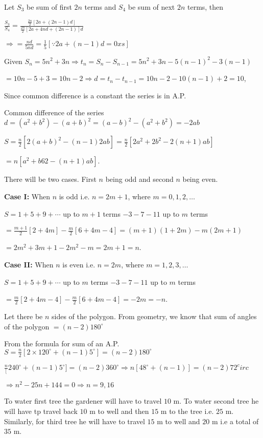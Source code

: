  Let $S_3$ be sum of first $2n$ terms and $S_4$ be sum of next $2n$ terms, then

  $\frac{S_3}{S_4} = \frac{\tfrac{2n}{2}[2a + (2n - 1)d]}{\tfrac{2n}{2}[2a + 4nd + (2n - 1)]d}$

  $\Rightarrow = \frac{nd}{5nd} = \frac{1}{5}[\because 2a + (n - 1)d = 0xs]$
\item Given $S_n = 5n^2 + 3n \Rightarrow t_n = S_n - S_{n - 1} = 5n^2 + 3n - 5(n - 1)^2 - 3(n - 1)$

  $= 10n - 5 + 3 = 10n - 2 \Rightarrow d = t_n - t_{n - 1} = 10n - 2 - 10(n - 1) + 2 = 10$,

  Since common difference is a constant the series is in A.P.
\item Common difference of the series $d = (a^2 + b^2) - (a + b)^2 = (a - b)^2 - (a^2 + b^2) = -2ab$

  $S = \frac{n}{2}[2(a + b)^2 - (n - 1)2ab] = \frac{n}{2}[2a^2 + 2b^2 - 2(n + 1)ab]$

  $= n[a^2 + b62 - (n + 1)ab]$.
\item There will be two cases. First $n$ being odd and second $n$ being even.

  {\bf Case I:} When $n$ is odd i.e. $n = 2m + 1$, where $m = 0, 1, 2, \ldots$

  $S = 1 + 5 + 9 + \cdots$ up to $m + 1$ terms $- 3 - 7 - 11$ up to $m$ terms

  $= \frac{m + 1}{2}[2 + 4m] - \frac{m}{2}[6 + 4m - 4] = (m + 1)(1 + 2m) - m(2m + 1)$

  $= 2m^2 + 3m + 1 - 2m^2 - m = 2m + 1 = n$.

  {\bf Case II:} When $n$ is even i.e. $n = 2m$, where $m =1, 2, 3, \ldots$

  $S = 1 + 5 + 9 + \cdots$ up to $m$ terms $- 3 - 7 - 11$ up to $m$ terms

  $= \frac{m}{2}[2 + 4m - 4] - \frac{m}{2}[6 + 4m - 4] = -2m = -n$.
\item Let there be $n$ sides of the polygon. From geometry, we know that sum of angles of the polygon $= (n - 2)180^\circ$

  From the formula for sum of an A.P. $S = \frac{n}{2}[2\times120^\circ + (n - 1)5^\circ] = (n - 2)180^\circ$

  $\frac{n}[240^\circ + (n - 1)5^\circ] = (n - 2)360^\circ\Rightarrow n[48^\circ + (n - 1)] = (n - 2)72^circ$

  $\Rightarrow n^2 - 25n + 144 = 0 \Rightarrow n = 9, 16$
\item To water first tree the gardener will have to travel $10$ m. To water second tree he will
  have tp travel back $10$ m to well and then $15$ m to the tree i.e. $25$ m. Similarly, for third tree he will
  have to travel $15$ m to well and $20$ m i.e a total of $35$ m.

